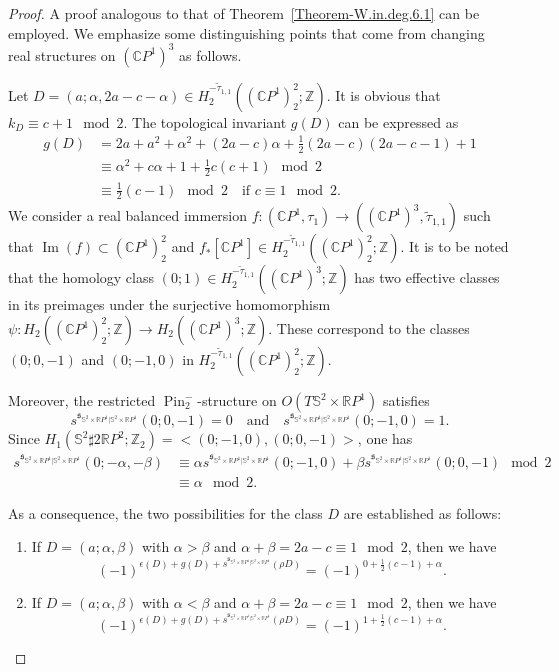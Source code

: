 \documentclass[11pt]{amsart}
\numberwithin{equation}{section}
\theoremstyle{definition}
\theoremstyle{plain}
\theoremstyle{remark}
\newcommand{\R}{\mathbb{R}}
\newcommand{\Z}{\mathbb{Z}}
\newcommand{\C}{\mathbb{C}}
\DeclareMathOperator{\Pin}{Pin}
\renewcommand{\Im}{\operatorname{Im}}
\begin{document}
\begin{proof}
  A proof analogous to that of Theorem~\ref{Theorem-W.in.deg.6.1}  can be employed. We emphasize some distinguishing points 
  that come from  changing real structures on $(\C P^1)^3$ as follows.

Let $D=(a;\alpha,2a-c-\alpha)\in H_2^{-\tilde{\tau}_{1,1}}((\C P^1)^2_2;\Z)$. 
It is obvious that $k_D\equiv c+1 \mod 2$. The topological invariant $g(D)$ can be expressed as
\begin{align*}
    g(D)&= 2a+a^2+\alpha^2+(2a-c)\alpha +\tfrac{1}{2}(2a-c)(2a-c-1)+1\\
    &\equiv \alpha^2+ c\alpha+1+\tfrac{1}{2}c(c+1) \mod 2\\
    & \equiv \tfrac{1}{2}(c-1)\mod 2 \quad \text{if } c\equiv 1 \mod 2.
\end{align*}
We consider a real balanced immersion $f\colon (\C P^1,\tau_1) \to ((\C P^1)^3,\tilde{\tau}_{1,1})$ such that $\Im(f)\subset (\C P^1)^2_2$ and $f_*[\C P^1]\in H_2^{-\tilde{\tau}_{1,1}}( (\C P^1)^2_2;\Z)$. It is to be noted that the homology class $(0;1)\in H_2^{-\tilde{\tau}_{1,1}}((\C P^1)^3;\Z)$ has two effective classes in its preimages under the surjective homomorphism $\psi\colon H_2((\C P^1)^2_2;\Z)\to H_2((\C P^1)^3;\Z)$. These correspond to the classes $(0;0,-1)$ and $(0;-1,0)$ in $H_2^{-\tilde{\tau}_{1,1}}( (\C P^1)^2_2;\Z)$. 

Moreover, the restricted $\Pin^-_2$-structure  on $O(T \mathbb{S}^2 \times \R P^1)$ satisfies $$s^{\mathfrak{s}_{\mathbb{S}^2 \times \R P^1|\mathbb{S}^2 \times \R P^1}}(0;0,-1)=0 \quad\text{and}\quad  s^{\mathfrak{s}_{\mathbb{S}^2 \times \R P^1|\mathbb{S}^2 \times \R P^1}}(0;-1,0)=1.$$ Since $H_1(\mathbb{S}^2\sharp 2 {\R P^2};\Z_2)=<(0;-1,0),(0;0,-1)>$, one has
\begin{align*}
    s^{\mathfrak{s}_{\mathbb{S}^2 \times \R P^1|\mathbb{S}^2 \times \R P^1}}(0;-\alpha,-\beta)
    &\equiv  \alpha s^{\mathfrak{s}_{\mathbb{S}^2 \times \R P^1|\mathbb{S}^2 \times \R P^1}}(0;-1,0)+\beta  s^{\mathfrak{s}_{\mathbb{S}^2 \times \R P^1|\mathbb{S}^2 \times \R P^1}}(0;0,-1) \mod 2\\
   & \equiv \alpha  \mod 2.
\end{align*}


As a consequence, the two possibilities for the class $D$ are established as follows:
\begin{enumerate}
    \item If $D=(a;\alpha,\beta)$ with $\alpha>\beta$ and $\alpha +\beta =2a-c \equiv 1 \mod 2$, then we have
$$(-1)^{\epsilon(D)+g(D)+s^{\mathfrak{s}_{\mathbb{S}^2 \times \R P^1|\mathbb{S}^2 \times \R P^1}}(\rho D)}=(-1)^{0+\frac{1}{2}(c-1)+\alpha}.$$
    \item  If $D=(a;\alpha,\beta)$ with $\alpha<\beta$ and $\alpha +\beta =2a-c \equiv 1 \mod 2$, then we have
$$(-1)^{\epsilon(D)+g(D)+s^{\mathfrak{s}_{\mathbb{S}^2 \times \R P^1|\mathbb{S}^2 \times \R P^1}}(\rho D)}=(-1)^{1+\frac{1}{2}(c-1)+\alpha }.$$
\end{enumerate}



\end{proof}
\end{document}
